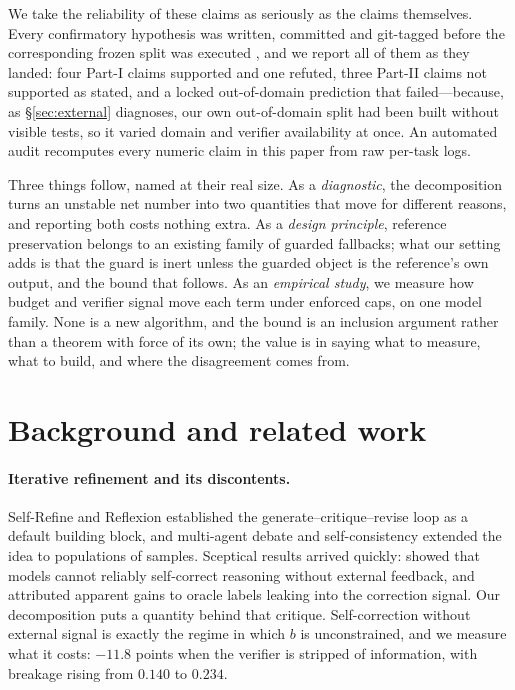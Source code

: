 \documentclass{article}
\newcommand{\brate}{b}
\begin{document}
We take the reliability of these claims as seriously as the claims themselves.
Every confirmatory hypothesis was written, committed and git-tagged before the
corresponding frozen split was executed \citep{nosek2018preregistration}, and we
report all of them as they landed: four Part-I claims supported and one refuted,
three Part-II claims not supported as stated, and a locked out-of-domain
prediction that failed---because, as \S\ref{sec:external} diagnoses, our own
out-of-domain split had been built without visible tests, so it varied domain
and verifier availability at once. An automated audit recomputes every numeric
claim in this paper from raw per-task logs.

Three things follow, named at their real size. As a \emph{diagnostic}, the
decomposition turns an unstable net number into two quantities that move for
different reasons, and reporting both costs nothing extra. As a \emph{design
principle}, reference preservation belongs to an existing family of guarded
fallbacks; what our setting adds is that the guard is inert unless the guarded
object is the reference's own output, and the bound that follows. As an
\emph{empirical study}, we measure how budget and verifier signal move each term
under enforced caps, on one model family. None is a new algorithm, and the bound
is an inclusion argument rather than a theorem with force of its own; the value
is in saying what to measure, what to build, and where the disagreement comes
from.

\section{Background and related work}

\paragraph{Iterative refinement and its discontents.} Self-Refine
\citep{madaan2023selfrefine} and Reflexion \citep{shinn2023reflexion}
established the generate--critique--revise loop as a default building block, and
multi-agent debate \citep{du2024debate} and self-consistency
\citep{wang2023selfconsistency} extended the idea to populations of samples.
Sceptical results arrived quickly: \citet{huang2024selfcorrect} showed that
models cannot reliably self-correct reasoning without external feedback, and
attributed apparent gains to oracle labels leaking into the correction signal.
Our decomposition puts a quantity behind that critique. Self-correction without
external signal is exactly the regime in which $\brate$ is unconstrained, and we
measure what it costs: $-11.8$ points when the verifier is stripped of
information, with breakage rising from $0.140$ to $0.234$.
\end{document}
